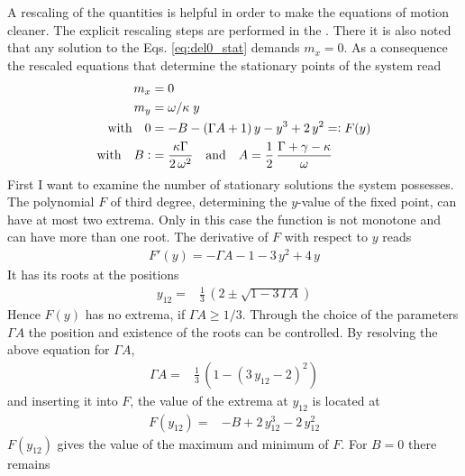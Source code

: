 A rescaling of the quantities is helpful in order to make the equations of motion cleaner. The explicit rescaling steps are performed in the . There it is also noted that any solution to the Eqs. \ref{eq:del0_stat} demands $m_x=0$. As a consequence the rescaled equations that determine the stationary points of the system read
\begin{align}
    m_x&=0\notag\\
    m_y&={\omega}/{\kappa}\;{y}\notag\\
    \text{with}\quad0&=-B-(\Gamma A+1)\,{y}    - {y}^3+2\,{y}^2=\vcentcolon F({y})\notag\\
    \text{with}\quad B\vcentcolon&= \frac{{\kappa}\Gamma}{{2}\,{\omega}^2}\quad\text{and}\quad A =\frac{1}{2}\, \frac{\Gamma+\gamma-\kappa}{\omega}
\end{align}
First I want to examine the number of stationary solutions the system possesses. The polynomial $F$ of third degree, determining the $y$-value of the fixed point, can have at most two extrema. Only in this case the function is not monotone and can have more than one root. The derivative of $F$ with respect to $y$ reads
\begin{align*}
    F'(y)=-\Gamma A-1 -3\,y^2+4\,y
\end{align*}
It has its roots at the positions
\begin{align*}
    y_{12}%
    =&\frac{1}{3}\,\left(  2\pm \sqrt{1-3\,\Gamma A}  \right)
\end{align*}
Hence $F(y)$ has no extrema, if $\Gamma A\geq1/3$. Through the choice of the parameters $\Gamma A$ the position and existence of the roots can be controlled. By resolving the above equation for $\Gamma A$, 
\begin{align*}
    \Gamma A=& \frac{1}{3}\,\left(  1-(3\,y_{12}-2)^2 \right)
\end{align*}
and inserting it into $F$, the value of the extrema at $y_{12}$ is located at
\begin{align*}
    F(y_{12})=&%
    -B+2\,y_{12}^3-2\,y_{12}^2
\end{align*}
$F(y_{12})$ gives the value of the maximum and minimum of $F$. For $B=0$ there remains
